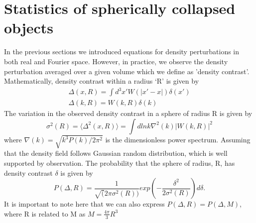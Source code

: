 \section{Statistics of spherically collapsed objects}
\label{stats}
In the previous sections we introduced equations for density perturbations in both real and Fourier space. However, in practice, we observe the density perturbation averaged over a given volume which we define as 'density contrast'. Mathematically, density contrast within a radius `R' is given by
\begin{eqnarray}
\Delta(x, R) = \int d^{3}x' W(|x' - x|) \delta(x') \\
\Delta(k, R) = W(k,R) \delta(k)
\end{eqnarray}
The variation in the observed density contrast in a sphere of radius R is given by
\begin{equation}
\sigma^{2}(R) = \langle \Delta^{2}(x,R) \rangle = \int d lnk \nabla^{2}(k) |W(k,R)|^{2}
\end{equation}
where $\nabla(k) = \sqrt{k^{3}P(k)/2\pi^{2}}$ is the dimensionless power spectrum.
Assuming that the density field follows Gaussian random distribution, which is well supported by observation. The probability that the sphere of radius, R, has density contrast $\delta$ is given by
\begin{equation}
P(\Delta, R) = \frac{1}{\sqrt(2 \pi \sigma^{2}(R))} exp(-\frac{\delta^{2}}{2\sigma^{2}(R)}) d\delta.
\end{equation}
It is important to note here that we can also express $P(\Delta, R) = P(\Delta, M)$, where R is related to M as $M = \frac{4\pi}{3} R^{3}$
